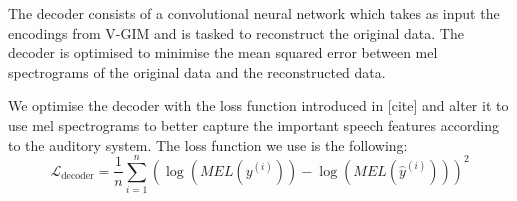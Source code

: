 	
	
		The decoder consists of a convolutional neural network which takes as input the encodings from V-GIM and is tasked to reconstruct the original data. The decoder is optimised to minimise the mean squared error between mel spectrograms of the original data and the reconstructed data. 
		
		We optimise the decoder with the loss function introduced in [cite] and alter it to use mel spectrograms to better capture the important speech features according to the auditory system. The loss function we use is the following:
		$$
		\mathcal{L}_{\text{decoder}} =\frac{1}{n} \sum_{i=1}^n\left( \log (MEL(y^{(i)})) -\log (MEL(\hat{y} ^{(i)} )) \right)^2
		$$
		
		
	
	
	
	
	
%	
%	
%	
%	
%	
%	
%	
	
	
	


%
%
%
%

